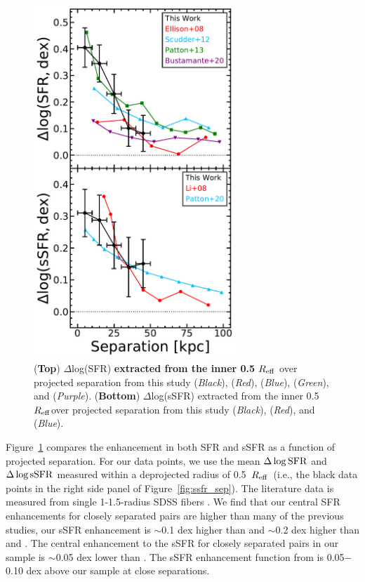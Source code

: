 \documentclass[apj,twocolumn]{emulateapj}
\newcommand{\reff}{$R_{\rm eff}$}
\begin{document}
\begin{CJK*}{UTF8}{gbsn}
\begin{figure}
\centering
\includegraphics[width=3in]{nuc_sep.pdf}
\caption[]{(\textbf{Top}) $\Delta$log(SFR) \textbf{extracted from the inner 0.5 \reff} over projected separation from this study ({\it Black}), \citet{Ellison:2008} ({\it Red}), \citet{Scudder:2012} ({\it Blue}), \citet{Patton:2013} ({\it Green}), and \citet{Bustamante:2020} ({\it Purple}). (\textbf{Bottom}) $\Delta$log(sSFR) extracted from the inner 0.5 \reff over projected separation from this study ({\it Black}), \citet{Li:2008} ({\it Red}), and \citet{Patton:2020} ({\it Blue}).
}
\label{fig:nuc_sep}
\end{figure}

Figure~\ref{fig:nuc_sep} compares the enhancement in both SFR and sSFR as a function of projected separation. For our data points, we use the mean $\Delta\log{\rm SFR}$ and $\Delta\log{\rm sSFR}$ measured within a deprojected radius of 0.5~\reff\ (i.e., the black data points in the right side panel of Figure~\ref{fig:ssfr_sep}). The literature data is measured from single 1-1.5\arcsec-radius SDSS fibers \citep{Ellison:2008,Scudder:2012,Patton:2013,Bustamante:2020}. We find that our central SFR enhancements for closely separated pairs are higher than many of the previous studies, our sSFR enhancement is $\sim$0.1 dex higher than \citet{Scudder:2012} and $\sim$0.2 dex higher than \citet{Ellison:2008} and \citet{Bustamante:2020}. The central enhancement to the sSFR for closely separated pairs in our sample is $\sim$0.05 dex lower than \citet{Patton:2013}. The sSFR enhancement function from \citet{Li:2008} is 0.05$-$0.10 dex above our sample at close separations.   


\end{CJK*}
\end{document}
